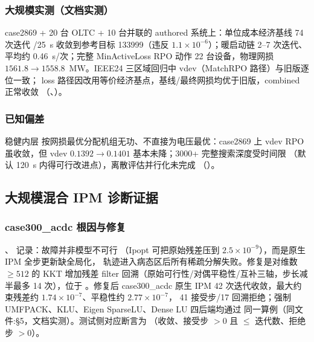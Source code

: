 \subsubsection*{大规模实测（文档实测）}
case2869 + 20 台 OLTC + 10 台并联的 authored 系统上：单位成本经济基线 74 次迭代
/25~s 收敛到参考目标 133999（违反 $1.1\times10^{-6}$）；暖启动链 2--7 次迭代、
平均约 0.46~s/次；完整 MinActiveLoss RPO 动作 22 台设备，物理网损
$1561.8\to1558.8$~MW。IEEE24 三区域回归中 vdev（MatchRPO 路径）与旧版逐位一致；
loss 路径因改用等价经济基点，基线/最终网损均优于旧版，combined 正常收敛
（、）。

\subsubsection*{已知偏差}
稳健内层  按网损最优分配机组无功、不直接为电压最优：case2869 上
vdev RPO 虽收敛，但 vdev $0.1392\to0.1401$ 基本未降；3000+ 完整搜索深度受时间限
（默认 120~s 内得可行改进点），离散评估并行化未完成
（）。

\subsection{大规模混合 IPM 诊断证据}\label{subsec:ver:ipm}

\subsubsection*{case300\_acdc 根因与修复}
、 记录：故障并非模型不可行
（Ipopt 可把原始残差压到 $2.5\times10^{-9}$），而是原生 IPM 全步更新缺全局化，
轨迹进入病态区后所有稀疏分解失败。修复是对维数 $\ge512$ 的 KKT 增加残差 filter
回溯（原始可行性/对偶平稳性/互补三轴，步长减半最多 14 次），位于
。修复后 case300\_acdc 原生 IPM
42 次迭代收敛，最大约束残差约 $1.74\times10^{-7}$、平稳性约 $2.77\times10^{-7}$，
41 接受步/17 回溯拒绝；强制 UMFPACK、KLU、Eigen SparseLU、Dense LU 四后端均通过
同一算例（同文件:§5，文档实测）。测试侧对应断言为
（收敛、接受步 $>0$ 且
$\le$ 迭代数、拒绝步 $>0$）。

